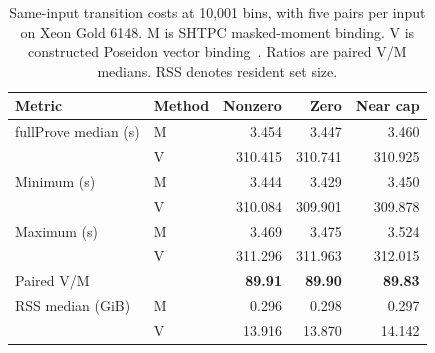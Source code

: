 \begin{table}[t]
\centering
\caption{Same-input transition costs at 10,001 bins, with five pairs per input on Xeon Gold 6148. M is SHTPC masked-moment binding. V is constructed Poseidon vector binding~\cite{Grassi2021Poseidon}. Ratios are paired V/M medians. RSS denotes resident set size.}
\label{tab:binding-cost}
\footnotesize
\renewcommand{\arraystretch}{1.06}
\setlength{\tabcolsep}{2pt}
\begin{tabular*}{\columnwidth}{@{\extracolsep{\fill}}llrrr@{}}
\toprule
\textbf{Metric} & \textbf{Method} & \textbf{Nonzero} & \textbf{Zero} & \textbf{Near cap} \\
\midrule
\rowcolor{black!5} fullProve median (s) & M & 3.454 & 3.447 & 3.460 \\
\rowcolor{black!5} & V & 310.415 & 310.741 & 310.925 \\
Minimum (s) & M & 3.444 & 3.429 & 3.450 \\
 & V & 310.084 & 309.901 & 309.878 \\
Maximum (s) & M & 3.469 & 3.475 & 3.524 \\
 & V & 311.296 & 311.963 & 312.015 \\
\rowcolor{black!5} Paired V/M & & \textbf{89.91} & \textbf{89.90} & \textbf{89.83} \\
\midrule
RSS median (GiB) & M & 0.296 & 0.298 & 0.297 \\
 & V & 13.916 & 13.870 & 14.142 \\
\bottomrule
\end{tabular*}
\end{table}
